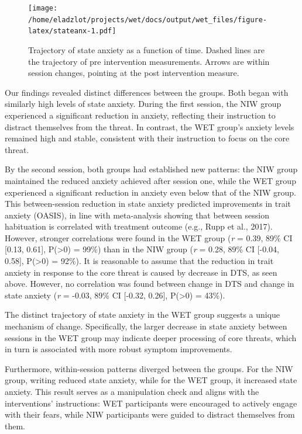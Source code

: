 \documentclass[
  man,floatsintext]{apa7}
\begin{document}
\begin{figure}
\centering
\texttt{[image: /home/eladzlot/projects/wet/docs/output/wet\_files/figure-latex/stateanx-1.pdf]}
\caption{\label{fig:stateanx}Trajectory of state anxiety as a function of time. Dashed lines are the trajectory of pre intervention measurements. Arrows are within session changes, pointing at the post intervention measure.}
\end{figure}

Our findings revealed distinct differences between the groups.
Both began with similarly high levels of state anxiety.
During the first session, the NIW group experienced a significant reduction in anxiety, reflecting their instruction to distract themselves from the threat.
In contrast, the WET group's anxiety levels remained high and stable, consistent with their instruction to focus on the core threat.

By the second session, both groups had established new patterns:
the NIW group maintained the reduced anxiety achieved after session one, while the WET group experienced a significant reduction in anxiety even below that of the NIW group.
This between-session reduction in state anxiety predicted improvements in trait anxiety (OASIS), in line with meta-analysis showing that between session habituation is correlated with treatment outcome (e.g., Rupp et al., 2017).
However, stronger correlations were found in the WET group (\emph{r} = 0.39, 89\% CI {[}0.13, 0.61{]}, P(\textgreater0) = 99\%) than in the NIW group (\emph{r} = 0.28, 89\% CI {[}-0.04, 0.58{]}, P(\textgreater0) = 92\%).
It is reasonable to assume that the reduction in trait anxiety in response to the core threat is caused by decrease in DTS, as seen above.
However, no correlation was found between change in DTS and change in state anxiety (\emph{r} = -0.03, 89\% CI {[}-0.32, 0.26{]}, P(\textgreater0) = 43\%).

The distinct trajectory of state anxiety in the WET group suggests a unique mechanism of change.
Specifically, the larger decrease in state anxiety between sessions in the WET group may indicate deeper processing of core threats, which in turn is associated with more robust symptom improvements.

Furthermore, within-session patterns diverged between the groups.
For the NIW group, writing reduced state anxiety, while for the WET group, it increased state anxiety.
This result serves as a manipulation check and aligns with the interventions' instructions: WET participants were encouraged to actively engage with their fears, while NIW participants were guided to distract themselves from them.
\end{document}
